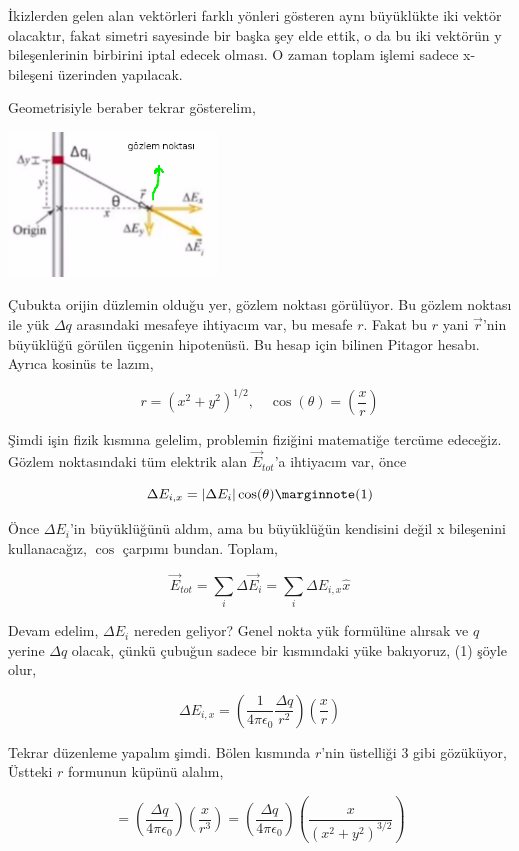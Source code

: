 \documentclass[12pt,fleqn]{article}\usepackage{../../common}
\begin{document}
İkizlerden gelen alan vektörleri farklı yönleri gösteren aynı büyüklükte
iki vektör olacaktır, fakat simetri sayesinde bir başka şey elde ettik, o
da bu iki vektörün y bileşenlerinin birbirini iptal edecek olması. O zaman
toplam işlemi sadece x-bileşeni üzerinden yapılacak. 

Geometrisiyle beraber tekrar gösterelim,

\includegraphics[width=15em]{05_05.png}

Çubukta orijin düzlemin olduğu yer, gözlem noktası görülüyor. Bu gözlem
noktası ile yük $\Delta q$ arasındaki mesafeye ihtiyacım var, bu mesafe
$r$. Fakat bu $r$ yani $\vec{r}$'nin büyüklüğü görülen üçgenin
hipotenüsü. Bu hesap için bilinen Pitagor hesabı. Ayrıca kosinüs te lazım, 

$$ r = (x^2 + y^2)^{1/2}, \quad \cos(\theta)  = \left( \frac{x}{r}\right)$$ 

Şimdi işin fizik kısmına gelelim, problemin fiziğini matematiğe tercüme
edeceğiz. Gözlem noktasındaki tüm elektrik alan $\vec{E}_{tot}$'a ihtiyacım
var, önce

$$ 
\Delta E_{i,x} = |\Delta E_i| \cos (\theta)  
\mlabel{1} 
$$

Önce $\Delta E_i$'in büyüklüğünü aldım, ama bu büyüklüğün kendisini değil x
bileşenini kullanacağız, $\cos$ çarpımı bundan. Toplam,

$$ \vec{E}_{tot} = \sum_i \Delta \vec{E}_i = \sum_i \Delta E_{i,x}\hat{x} $$

Devam edelim, $\Delta E_i$ nereden geliyor? Genel nokta yük formülüne
alırsak ve $q$ yerine $\Delta q$ olacak, çünkü çubuğun sadece bir
kısmındaki yüke bakıyoruz, (1) şöyle olur,

$$ 
\Delta E_{i,x} = 
\left( 
  \frac{1}{4\pi\epsilon_0} \frac{\Delta q}{r^2} 
\right) 
\left(\frac{x}{r} \right)
$$

Tekrar düzenleme yapalım şimdi. Bölen kısmında $r$'nin üstelliği 3 gibi
gözüküyor, Üstteki $r$ formunun küpünü alalım,

$$ 
= \left(   \frac{\Delta q}{4\pi\epsilon_0}  \right) \left(\frac{x}{r^3} \right)
= \left(   \frac{\Delta q}{4\pi\epsilon_0}  \right) 
  \left(\frac{x}{(x^2+y^2)^{3/2}} \right)
$$
\end{document}
